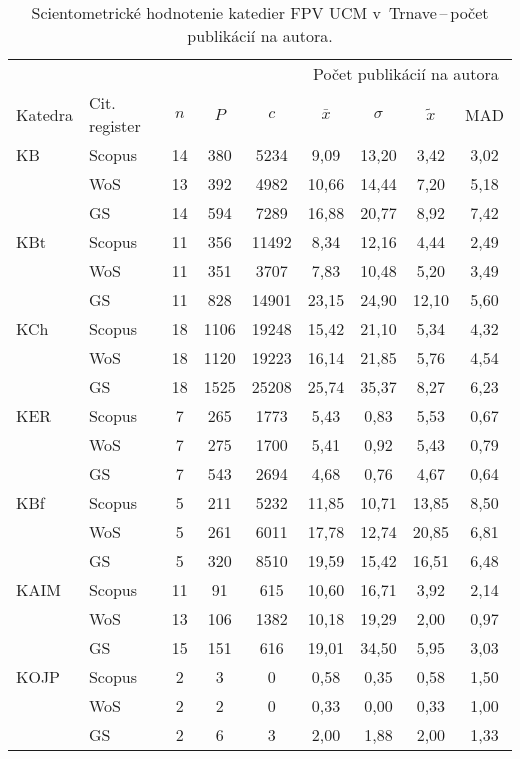 \begin{table}
  \centering\small
  \caption[Hodnotenie FPV\,--\,počet publikácií na autora]%
  {Scientometrické hodnotenie katedier FPV UCM v~Trnave\,--\,počet publikácií na
    autora.}
  \label{tab:1-staff.results}
  \begin{tabularx}{\textwidth}{lXc@{\hspace{2.5em}}c@{\hspace{2.5em}}c@{\hspace{3.5em}}cccc}
    \toprule
    & & & & & \multicolumn{4}{c}{Počet publikácií na autora} \\
    \cmidrule{6-9}
    Katedra & Cit. register & $n$ & $P$ & $c$ & $\bar{x}$ & $\sigma$ & $\tilde{x}$ & MAD \\
    \midrule
    KB   & Scopus & 14 & 380  & 5234  & 9,09  & 13,20 & 3,42  & 3,02 \\
         & WoS    & 13 & 392  & 4982  & 10,66 & 14,44 & 7,20  & 5,18 \\
         & GS     & 14 & 594  & 7289  & 16,88 & 20,77 & 8,92  & 7,42 \\[1ex]
    KBt  & Scopus & 11 & 356  & 11492 & 8,34  & 12,16 & 4,44  & 2,49 \\
         & WoS    & 11 & 351  & 3707  & 7,83  & 10,48 & 5,20  & 3,49 \\
         & GS     & 11 & 828  & 14901 & 23,15 & 24,90 & 12,10 & 5,60 \\[1ex]
    KCh  & Scopus & 18 & 1106 & 19248 & 15,42 & 21,10 & 5,34  & 4,32 \\
         & WoS    & 18 & 1120 & 19223 & 16,14 & 21,85 & 5,76  & 4,54 \\
         & GS     & 18 & 1525 & 25208 & 25,74 & 35,37 & 8,27  & 6,23 \\[1ex]
    KER  & Scopus & 7  & 265  & 1773  & 5,43  & 0,83  & 5,53  & 0,67 \\
         & WoS    & 7  & 275  & 1700  & 5,41  & 0,92  & 5,43  & 0,79 \\
         & GS     & 7  & 543  & 2694  & 4,68  & 0,76  & 4,67  & 0,64 \\[1ex]
    KBf  & Scopus & 5  & 211  & 5232  & 11,85 & 10,71 & 13,85 & 8,50 \\
         & WoS    & 5  & 261  & 6011  & 17,78 & 12,74 & 20,85 & 6,81 \\
         & GS     & 5  & 320  & 8510  & 19,59 & 15,42 & 16,51 & 6,48 \\[1ex]
    KAIM & Scopus & 11 & 91   & 615   & 10,60 & 16,71 & 3,92  & 2,14 \\
         & WoS    & 13 & 106  & 1382  & 10,18 & 19,29 & 2,00  & 0,97 \\
         & GS     & 15 & 151  & 616   & 19,01 & 34,50 & 5,95  & 3,03 \\[1ex]
    KOJP & Scopus & 2  & 3    & 0     & 0,58  & 0,35  & 0,58  & 1,50 \\
         & WoS    & 2  & 2    & 0     & 0,33  & 0,00  & 0,33  & 1,00 \\
         & GS     & 2  & 6    & 3     & 2,00  & 1,88  & 2,00  & 1,33 \\
    \bottomrule
  \end{tabularx}
\end{table}

